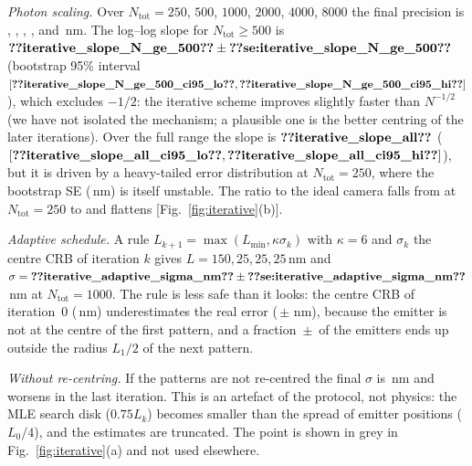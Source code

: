 \emph{Photon scaling.} Over $N_{\mathrm{tot}}=250$, $500$, $1000$, $2000$, $4000$, $8000$ the
final precision is ,
,
,
,
 and
\,nm. The log--log slope for
$N_{\mathrm{tot}}\ge500$ is
$\pnum{iterative_slope_N_ge_500}\pm\pnumse{iterative_slope_N_ge_500}$
(bootstrap 95\% interval $[\pnum{iterative_slope_N_ge_500_ci95_lo}\src{iterative_slope_N_ge_500_ci95_lo},
\pnum{iterative_slope_N_ge_500_ci95_hi}\src{iterative_slope_N_ge_500_ci95_hi}]$), which excludes
$-1/2$: the iterative scheme improves slightly faster than $N^{-1/2}$ (we have not isolated the
mechanism; a plausible one is the better centring of the later iterations). Over the full range
the slope is $\pnum{iterative_slope_all}\src{iterative_slope_all}$
($[\pnum{iterative_slope_all_ci95_lo}\src{iterative_slope_all_ci95_lo},
\pnum{iterative_slope_all_ci95_hi}\src{iterative_slope_all_ci95_hi}]$), but it is driven by a
heavy-tailed error distribution at $N_{\mathrm{tot}}=250$, where the bootstrap SE
(\,nm) is itself unstable. The ratio to the ideal camera falls
from  at $N_{\mathrm{tot}}=250$ to
 and flattens [Fig.~\ref{fig:iterative}(b)].

\emph{Adaptive schedule.} A rule $L_{k+1}=\max(L_{\min},\kappa\sigma_k)$ with $\kappa=6$ and
$\sigma_k$ the centre CRB of iteration $k$ gives $L=150,25,25,25$\,nm and
$\sigma=\pnum{iterative_adaptive_sigma_nm}\pm\pnumse{iterative_adaptive_sigma_nm}$\,nm
at $N_{\mathrm{tot}}=1000$. The rule is less safe than it looks: the centre CRB of iteration~0
(\,nm) underestimates the
real error (\,$\pm$\,\,nm),
because the emitter is not at the centre of the first pattern, and a fraction
\,$\pm$\,
of the emitters ends up outside the radius $L_1/2$ of the next pattern.

\emph{Without re-centring.} If the patterns are not re-centred the final $\sigma$ is
\,nm
and worsens in the last iteration. This is an artefact of the protocol, not physics: the MLE
search disk ($0.75L_k$) becomes smaller than the spread of emitter positions ($L_0/4$), and the
estimates are truncated. The point is shown in grey in Fig.~\ref{fig:iterative}(a) and not used
elsewhere.

